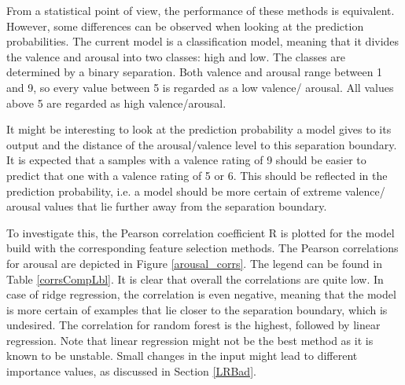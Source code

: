 

From a statistical point of view, the performance of these methods is equivalent. However, some differences can be observed when looking at the prediction probabilities. The current model is a classification model, meaning that it divides the valence and arousal into two classes: high and low. The classes are determined by a binary separation. Both valence and arousal range between 1 and 9, so every value between 5 is regarded as a low valence/ arousal. All values above 5 are regarded as high valence/arousal.

\npar

It might be interesting to look at the prediction probability a model gives to its output and the distance of the arousal/valence level to this separation boundary. It is expected that a samples with a valence rating of 9 should be easier to predict that one with a valence rating of 5 or 6. This should be reflected in the prediction probability, i.e. a model should be more certain of extreme valence/ arousal values that lie further away from the separation boundary.

\npar

To investigate this, the Pearson correlation coefficient R is plotted for the model build with the corresponding feature selection methods. The Pearson correlations for arousal are depicted in Figure \ref{arousal_corrs}. The legend can be found in Table \ref{corrsCompLbl}. It is clear that overall the correlations are quite low. In case of ridge regression, the correlation is even negative, meaning that the model is more certain of examples that lie closer to the separation boundary, which is undesired. The correlation for random forest is the highest, followed by linear regression. Note that linear regression might not be the best method as it is known to be unstable. Small changes in the input might lead to different importance values, as discussed in Section \ref{LRBad}.

